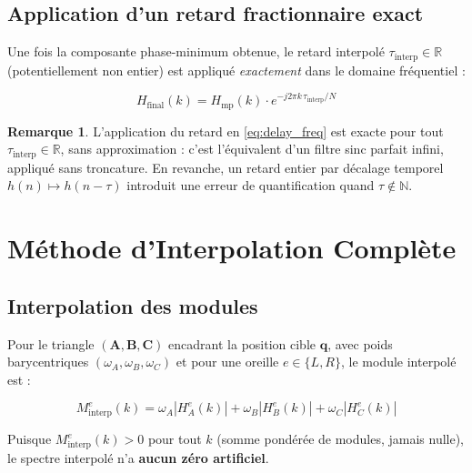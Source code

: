 \documentclass[12pt, a4paper]{article}
\theoremstyle{definition}
\newtheorem{remarque}{Remarque}[section]
\newcommand{\R}{\mathbb{R}}
\newcommand{\N}{\mathbb{N}}
\newcommand{\vect}[1]{\bm{#1}}
\newcommand{\abs}[1]{\left| #1 \right|}
\begin{document}
\subsection{Application d'un retard fractionnaire exact}

Une fois la composante phase-minimum obtenue, le retard interpolé
$\tau_{\mathrm{interp}} \in \R$ (potentiellement non entier) est appliqué
\emph{exactement} dans le domaine fréquentiel :

\begin{equation}
  H_{\mathrm{final}}(k) = H_{\mathrm{mp}}(k) \cdot e^{-j2\pi k \,\tau_{\mathrm{interp}}/N}
  \label{eq:delay_freq}
\end{equation}

\begin{remarque}
  L'application du retard en \eqref{eq:delay_freq} est exacte pour tout
  $\tau_{\mathrm{interp}} \in \R$, sans approximation : c'est l'équivalent
  d'un filtre sinc parfait infini, appliqué sans troncature. En revanche,
  un retard entier par décalage temporel $h(n) \mapsto h(n - \tau)$ introduit
  une erreur de quantification quand $\tau \notin \N$.
\end{remarque}

\section{Méthode d'Interpolation Complète}

\subsection{Interpolation des modules}

Pour le triangle $(\vect{A}, \vect{B}, \vect{C})$ encadrant la position cible
$\vect{q}$, avec poids barycentriques $(\omega_A, \omega_B, \omega_C)$ et pour
une oreille $e \in \{L, R\}$, le module interpolé est :

\begin{equation}
  M_{\mathrm{interp}}^e(k) = \omega_A \abs{H_A^e(k)} + \omega_B \abs{H_B^e(k)}
  + \omega_C \abs{H_C^e(k)}
  \label{eq:interp_magnitude}
\end{equation}

Puisque $M_{\mathrm{interp}}^e(k) > 0$ pour tout $k$ (somme pondérée de
modules, jamais nulle), le spectre interpolé n'a \textbf{aucun zéro artificiel}.
\end{document}
